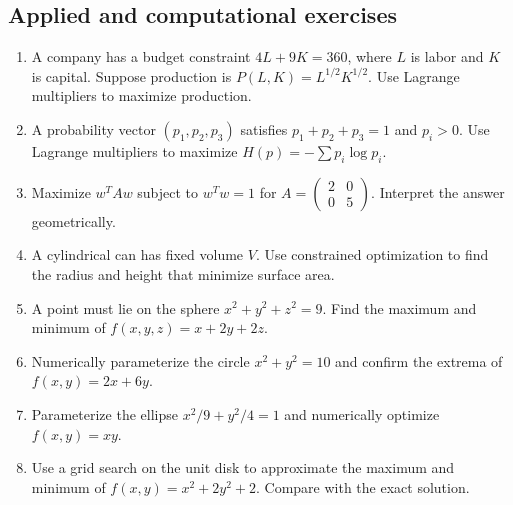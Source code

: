 \documentclass[11pt]{article}
\begin{document}
\subsection*{Applied and computational exercises}
\begin{enumerate}[start=16]
  \item A company has a budget constraint $4L+9K=360$, where $L$ is labor and $K$ is capital. Suppose production is $P(L,K)=L^{1/2}K^{1/2}$. Use Lagrange multipliers to maximize production.
  \item A probability vector $(p_1,p_2,p_3)$ satisfies $p_1+p_2+p_3=1$ and $p_i>0$. Use Lagrange multipliers to maximize $H(p)=-\sum p_i\log p_i$.
  \item Maximize $w^T A w$ subject to $w^T w=1$ for $A=\begin{pmatrix}2&0\\0&5\end{pmatrix}$. Interpret the answer geometrically.
  \item A cylindrical can has fixed volume $V$. Use constrained optimization to find the radius and height that minimize surface area.
  \item A point must lie on the sphere $x^2+y^2+z^2=9$. Find the maximum and minimum of $f(x,y,z)=x+2y+2z$.
  \item Numerically parameterize the circle $x^2+y^2=10$ and confirm the extrema of $f(x,y)=2x+6y$.
  \item Parameterize the ellipse $x^2/9+y^2/4=1$ and numerically optimize $f(x,y)=xy$.
  \item Use a grid search on the unit disk to approximate the maximum and minimum of $f(x,y)=x^2+2y^2+2$. Compare with the exact solution.
\end{enumerate}
\end{document}
